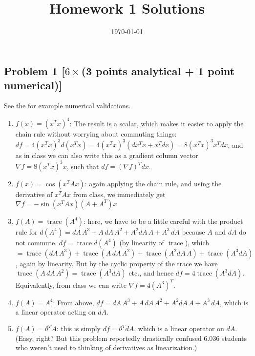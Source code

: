 \documentclass[10pt,oneside]{article}
\author{}
\title{Homework 1 Solutions}
\date{\today}
\newcommand{\tr}{\operatorname{trace}}
\begin{document}
\maketitle
\thispagestyle{fancy} 


\subsection*{Problem 1 [$6\times{}$(3 points analytical + 1 point numerical)]}

See the  for example numerical validations.

\begin{enumerate}[label=\alph*)]
    \item  $f(x)=(x^T x)^4$: The result is a scalar, which makes it easier to apply the chain rule without worrying about commuting things: $df = 4(x^T x)^3 d(x^T x) = 4(x^T x)^3(dx^T x + x^T dx) = 8(x^T x)^3 x^T dx$, and as in class we can also write this as a gradient column vector $\nabla f = 8(x^T x)^3 x$, such that $df = (\nabla f)^T dx$.
    
    \item $f(x) = \cos(x^T Ax)$: again applying the chain rule, and using the derivative of $x^T Ax$ from class, we immediately get $\nabla f = -\sin(x^T Ax)(A+A^T)x$
    
    \item $f(A)=\tr( A^4)$: here, we have to be a little careful with the product rule for $d(A^4) = dA\, A^3 + A\,dA\,A^2+A^2dA\,A+A^3\,dA$ because $A$ and $dA$ do not commute.  $df = \tr d(A^4)$ (by linearity of $\tr$), which $= \tr(dA\, A^3) + \tr(A\,dA\,A^2)+\tr(A^2dA\,A)+\tr(A^3dA)$, again by linearity.  But by the cyclic property of the trace we have $\tr(A\,dA\,A^2) = \tr(A^3dA)$ etc., and hence $df = 4\tr(A^3dA)$.  Equivalently, from class we can write $\nabla f = 4(A^3)^T$.
    \item $f(A)=A^4$: From above, $df = dA\, A^3 + A\,dA\,A^2+A^2dA\,A+A^3\,dA$, which is a linear operator acting on $dA$.
    
    \item $f(A) = \theta^T A$: this is simply $df =\theta^T dA$, which is a linear operator on $dA$.  (Easy, right?  But this problem reportedly drastically confused 6.036 students who weren't used to thinking of derivatives as linearization.)
    

\end{enumerate}
\end{document}
